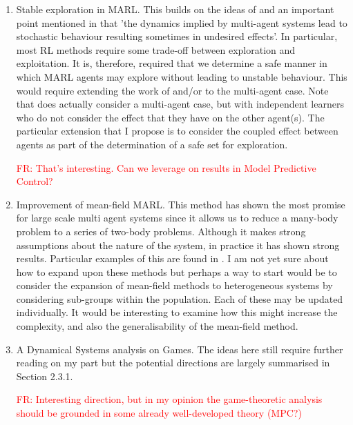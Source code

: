 \documentclass[preprint,11pt]{report}
\newcommand\fr[1]{\textcolor{red}{FR: #1}}
\begin{document}
\begin{enumerate}
	\item Stable exploration in MARL. This builds on the ideas of
          \cite{Berkenkamp2017,Jin2018Stability-certifiedPerspective}
          and an important point mentioned in \cite{Marinescu2014}
          that 'the dynamics implied by multi-agent systems lead to
          stochastic behaviour resulting sometimes in undesired
          effects'. In particular, most RL methods require some
          trade-off between exploration and exploitation. It is,
          therefore, required that we determine a safe manner in which
          MARL agents may explore without leading to unstable
          behaviour. This would require extending the work of
          \cite{Berkenkamp2017} and/or
          \cite{Jin2018Stability-certifiedPerspective} to the
          multi-agent case. Note that
          \cite{Jin2018Stability-certifiedPerspective} does actually
          consider a multi-agent case, but with independent learners
          who do not consider the effect that they have on the other
          agent(s). The particular extension that I propose is to
          consider the coupled effect between agents as part of the
          determination of a safe set for exploration.

        \fr{That's interesting. Can we leverage on results in Model
          Predictive Control?}

	\item Improvement of mean-field MARL. This method has shown the most promise for large scale
	multi agent systems since it allows us to reduce a many-body problem to a series of two-body
	problems. Although it makes strong assumptions about the nature of the system, in practice it
	has shown strong results. Particular examples of this are found in 
	\cite{Subramanian2019,Yang2018}. I am not yet sure about how to expand upon these methods but
	perhaps a way to start would be to consider the expansion of mean-field methods to heterogeneous
	systems by considering sub-groups within the population. Each of these may be updated
	individually. It would be interesting to examine how this might increase the complexity, and
	also the generalisability of the mean-field method.
	\item A Dynamical Systems analysis on Games. The ideas here
          still require further reading on my part but the potential
          directions are largely summarised in Section 2.3.1.

          \fr{Interesting direction, but in my opinion the game-theoretic analysis should be grounded in some already well-developed theory (MPC?)}
\end{enumerate}



 


\end{document}
